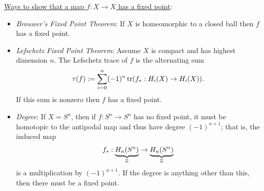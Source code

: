 \documentclass{amsart}
\begin{document}
	\underline{Ways to show that a map $f:X\to X$ has a fixed point}:
	\begin{itemize}
		\item \textit{Brouwer's Fixed Point Theorem}: If $X$ is homeomorphic to a closed ball then $f$ has a fixed point.
		\item \textit{Lefschetz Fixed Point Theorem}: Assume $X$ is compact and has highest dimension $n$. The Lefschetz trace of $f$ is the alternating sum
		$$
		\tau(f) := \sum_{i=0}^{n} (-1)^n \operatorname{tr}(f_*:H_i(X)\to H_i(X)).
		$$ 
		If this sum is nonzero then $f$ has a fixed point.
		\item \textit{Degree}: If $X=S^n$, then if $f:S^n\to S^n$ has no fixed point, it must be homotopic to the antipodal map and thus have degree $(-1)^{n+1}$; that is, the induced map
		$$
		f_*:\underbrace{H_n(S^n)}_{\mathbb{Z}}\to \underbrace{H_n(S^n)}_{\mathbb{Z}}
		$$
		is a multiplication by $(-1)^{n+1}$. If the degree is anything other than this, then there must be a fixed point.
	\end{itemize}
	\newpage
%	
%	
	
\end{document}
